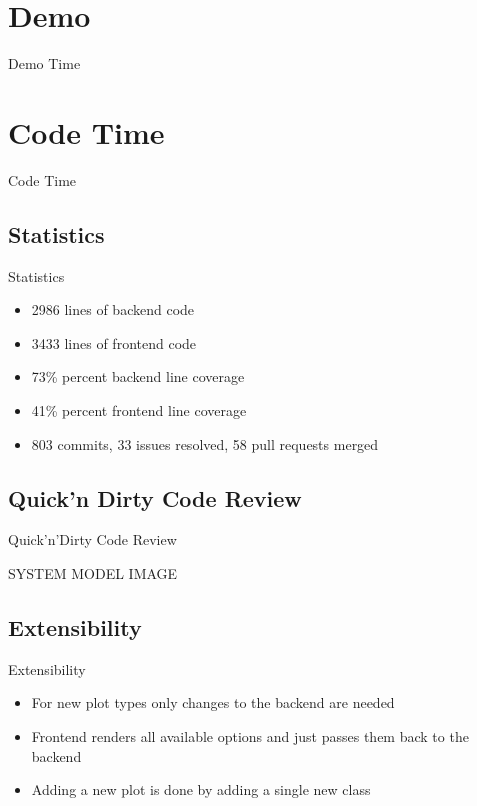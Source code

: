 \documentclass{beamer}
\begin{document}
\section{Demo}
\begin{frame}
  \begin{center}
    \Huge{Demo Time}
  \end{center}
\end{frame}

\section{Code Time}
\begin{frame}
  \begin{center}
    \Huge{Code Time}
  \end{center}
\end{frame}

\subsection{Statistics}
\begin{frame}{Statistics}
  \begin{itemize}
      \item 2986 lines of backend code
      \item 3433 lines of frontend code
      \item 73\% percent backend line coverage
      \item 41\% percent frontend line coverage
      \item 803 commits, 33 issues resolved, 58 pull requests merged
  \end{itemize}
\end{frame}

\subsection{Quick'n Dirty Code Review}
\begin{frame}{Quick'n'Dirty Code Review}
  \begin{center}
    \large{SYSTEM MODEL IMAGE}
  \end{center}
\end{frame}

\subsection{Extensibility}
\begin{frame}{Extensibility}
  \begin{itemize}
    \item For new plot types only changes to the backend are needed
    \item Frontend renders all available options and just passes them back to the backend
    \item Adding a new plot is done by adding a single new class
  \end{itemize}
\end{frame}
\end{document}
